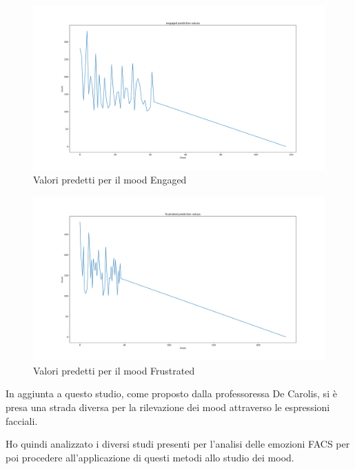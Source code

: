 \begin{figure}
    \begin{center}    
        \includegraphics[width=1\linewidth]{images/engaged prediction values.png}
        \caption{Valori predetti per il mood Engaged}
        \label{fig:image39}
    \end{center}
\end{figure}
\begin{figure}
    \begin{center}    
        \includegraphics[width=1\linewidth]{images/frustrated prediction values.png}
        \caption{Valori predetti per il mood Frustrated}
        \label{fig:image40}
    \end{center}
\end{figure}

\newpage
In aggiunta a questo studio, come proposto dalla professoressa De Carolis, si è 
presa una strada diversa per la rilevazione dei mood attraverso le espressioni facciali. 

Ho quindi analizzato i diversi studi presenti per l’analisi delle emozioni FACS per poi 
procedere all’applicazione di questi metodi allo studio dei mood. 

